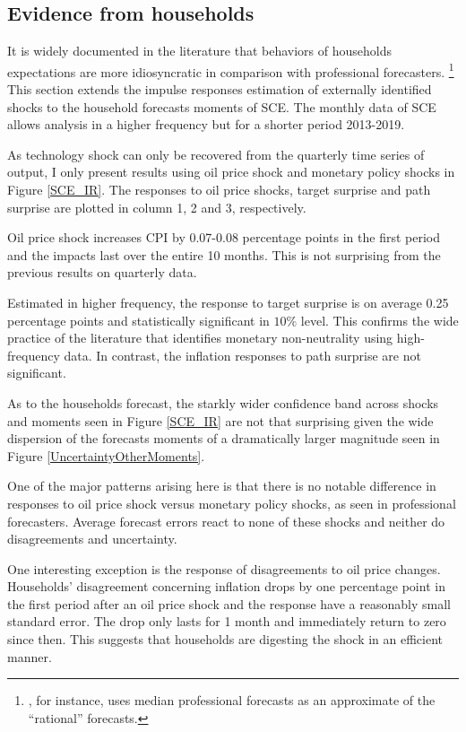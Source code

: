 \documentclass[12pt]{article}
\begin{document}
	\subsection{Evidence from households}
	
	It is widely documented in the literature that behaviors of households expectations are more idiosyncratic in comparison with professional forecasters. \footnote{\cite{carroll2003macroeconomic}, for instance, uses median professional forecasts as an approximate of the ``rational'' forecasts.} This section extends the impulse responses estimation of externally identified shocks to the household forecasts moments of SCE.  The monthly data of SCE allows analysis in a higher frequency but for a shorter period 2013-2019. 
	
	As technology shock can only be recovered from the quarterly time series of output, I only present results using oil price shock and monetary policy shocks in Figure \ref{SCE_IR}. The responses to oil price shocks, target surprise and path surprise are plotted in column 1, 2 and 3, respectively. 
	
	Oil price shock increases CPI by 0.07-0.08 percentage points in the first period and the impacts last over the entire 10 months. This is not surprising from the previous results on quarterly data. 
	
	Estimated in higher frequency, the response to target surprise is on average 0.25 percentage points and statistically significant in $10\%$ level. This confirms the wide practice of the literature that identifies monetary non-neutrality using high-frequency data. In contrast, the inflation responses to path surprise are not significant. 
	
	As to the households forecast, the starkly wider confidence band across shocks and moments seen in Figure \ref{SCE_IR} are not that surprising given the wide dispersion of the forecasts moments of a dramatically larger magnitude seen in Figure \ref{UncertaintyOtherMoments}.  
	
	One of the major patterns arising here is that there is no notable difference in responses to oil price shock versus monetary policy shocks, as seen in professional forecasters.  Average forecast errors react to none of these shocks and neither do disagreements and uncertainty.  
	
	One interesting exception is the response of disagreements to oil price changes. Households' disagreement concerning inflation drops by one percentage point in the first period after an oil price shock and the response have a reasonably small standard error. The drop only lasts for 1 month and immediately return to zero since then. This suggests that households are digesting the shock in an efficient manner.  
	
\end{document}

